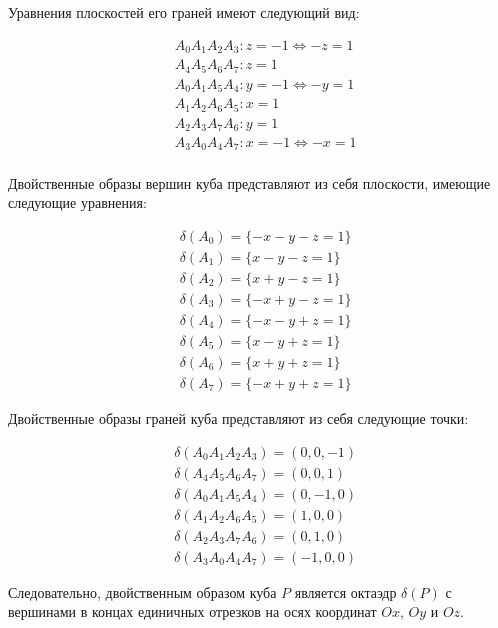 \documentclass[a4paper, 12pt, titlepage]{article}
\theoremstyle{definition}
\theoremstyle{plain}
\theoremstyle{plain}
\begin{document}
Уравнения плоскостей его граней имеют следующий вид:

\begin{align*}
 & A_{0} A_{1} A_{2} A_{3} : z = -1 \Leftrightarrow -z = 1 \\
 & A_{4} A_{5} A_{6} A_{7} : z = 1 \\
 & A_{0} A_{1} A_{5} A_{4} : y = -1 \Leftrightarrow -y = 1 \\
 & A_{1} A_{2} A_{6} A_{5} : x = 1 \\
 & A_{2} A_{3} A_{7} A_{6} : y = 1 \\
 & A_{3} A_{0} A_{4} A_{7} : x = -1 \Leftrightarrow -x = 1 \\
\end{align*}


Двойственные образы вершин куба представляют из себя плоскости, имеющие
следующие уравнения:

\begin{align*}
 & \delta(A_{0}) = \{ -x - y - z = 1 \} \\
 & \delta(A_{1}) = \{  x - y - z = 1 \} \\
 & \delta(A_{2}) = \{  x + y - z = 1 \} \\
 & \delta(A_{3}) = \{ -x + y - z = 1 \} \\
 & \delta(A_{4}) = \{ -x - y + z = 1 \} \\
 & \delta(A_{5}) = \{  x - y + z = 1 \} \\
 & \delta(A_{6}) = \{  x + y + z = 1 \} \\
 & \delta(A_{7}) = \{ -x + y + z = 1 \}
\end{align*}

Двойственные образы граней куба представляют из себя следующие точки:

\begin{align*}
 & \delta(A_{0} A_{1} A_{2} A_{3}) = ( 0,  0, -1) \\
 & \delta(A_{4} A_{5} A_{6} A_{7}) = ( 0,  0,  1) \\
 & \delta(A_{0} A_{1} A_{5} A_{4}) = ( 0, -1,  0) \\
 & \delta(A_{1} A_{2} A_{6} A_{5}) = ( 1,  0,  0) \\
 & \delta(A_{2} A_{3} A_{7} A_{6}) = ( 0,  1,  0) \\
 & \delta(A_{3} A_{0} A_{4} A_{7}) = (-1,  0,  0)
\end{align*}

Следовательно, двойственным образом куба $P$ является октаэдр $\delta(P)$ с
вершинами в концах единичных отрезков на осях координат $Ox$, $Oy$ и $Oz$.
\end{document}

